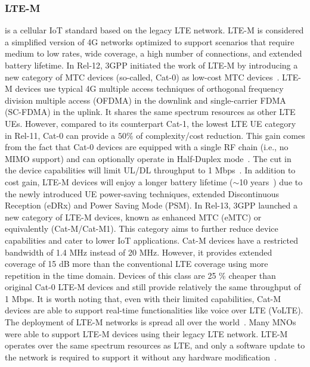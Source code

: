 \documentclass[]{IEEEtran}
\begin{document}
\subsubsection{LTE-M}
\label{sec:2-2-2}
is a cellular IoT standard based on the legacy LTE network.
LTE-M is considered a simplified version of 4G networks optimized to support scenarios that require medium to low rates, wide coverage, a high number of connections, and extended battery lifetime\cite{benhiba_comparative_2018}.
In Rel-12, 3GPP initiated the work of LTE-M by introducing a new category of MTC devices (so-called, Cat-0) as low-cost MTC devices~\cite{rico2016overview}.
LTE-M devices use typical 4G multiple access techniques of orthogonal frequency division multiple access (OFDMA) in the downlink and single-carrier FDMA (SC-FDMA) in the uplink.
It shares the same spectrum resources as other LTE UEs\cite{ding_iot_2020}.
However, compared to its counterpart Cat-1, the lowest LTE UE category in Rel-11, Cat-0 can provide a $50\%$ of complexity/cost reduction\cite{sharma2019toward}.
This gain comes from the fact that Cat-0 devices are equipped with a single RF chain (i.e., no MIMO support) and can optionally operate in Half-Duplex mode~\cite{liberg_cellular_2019}.
The cut in the device capabilities will limit UL/DL throughput to 1 Mbps~\cite{wang_information_2021}.
In addition to cost gain, LTE-M devices will enjoy a longer battery lifetime ($\sim$10 years~\cite{GSM_white_2018}) due to the newly introduced UE power-saving techniques, extended Discontinuous Reception (eDRx) and Power Saving Mode (PSM)\cite{raza2017low}.
In Rel-13, 3GPP launched a new category of LTE-M devices, known as enhanced MTC (eMTC) or equivalently (Cat-M/Cat-M1).
This category aims to further reduce device capabilities and cater to lower IoT applications.
Cat-M devices have a restricted bandwidth of 1.4 MHz instead of 20 MHz.
However, it provides extended coverage of 15 dB more than the conventional LTE coverage\cite{xu_narrowband_2018_3} using more repetition in the time domain.
Devices of this class are 25 $\%$  cheaper than original Cat-0 LTE-M devices and still provide relatively the same throughput of 1 Mbps\cite{herrero_fundamentals_2021}.
It is worth noting that, even with their limited capabilities, Cat-M devices are able to support real-time functionalities like voice over LTE (VoLTE)\cite{foubert2020long}.
The deployment of LTE-M networks is spread all over the world~\cite{foubert2020long}.
Many MNOs were able to support LTE-M devices using their legacy LTE network.
LTE-M operates over the same spectrum resources as LTE, and only a software update to the network is required to support it without any hardware modification~\cite{chaudhari2020lpwan}.
\end{document}
